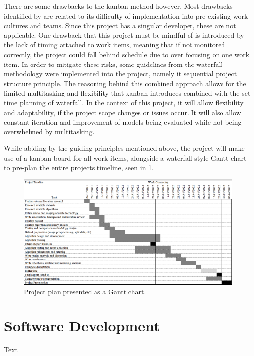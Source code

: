 There are some drawbacks to the kanban method however. Most drawbacks identified by \cite{ahmad2013kanban} are related to its difficulty of implementation into pre-existing work cultures and teams. Since this project has a singular developer, these are not applicable. One drawback that this project must be mindful of is introduced by the lack of timing attached to work items, meaning that if not monitored correctly, the project could fall behind schedule due to over focusing on one work item. In order to mitigate these risks, some guidelines from the waterfall methodology were implemented into the project, namely it sequential project structure principle. The reasoning behind this combined approach allows for the limited multitasking and flexibility that kanban introduces combined with the set time planning of waterfall. In the context of this project, it will allow flexibility and adaptability, if the project scope changes or issues occur. It will also allow constant iteration and improvement of models being evaluated while not being overwhelmed by multitasking.

While abiding by the guiding principles mentioned above, the project will make use of a kanban board for all work items, alongside a waterfall style Gantt chart to pre-plan the entire projects timeline, seen in \ref{fig:gantt-chart}.

\begin{figure}[H]
    \centering
    \includegraphics[width=\textwidth]{figures/gantt-chart.png}
    \caption{Project plan presented as a Gantt chart.}
    \label{fig:gantt-chart}
\end{figure}

\section{Software Development}
Text

